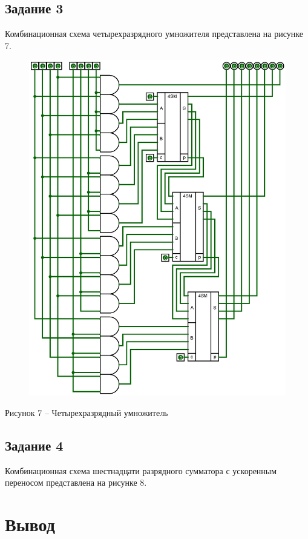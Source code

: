 \documentclass[a4paper,14pt]{extarticle}
\begin{document}
	\subsection*{Задание 3}
	Комбинационная схема четырехразрядного умножителя представлена на рисунке 7.
	\begin{figure}[h]
		\centering
		\includegraphics[width=0.9\linewidth]{images/s-3}
	\end{figure}
	\begin{center}
		Рисунок 7 – Четырехразрядный умножитель
	\end{center}
	
	\pagebreak
	\subsection*{Задание 4}
	Комбинационная схема шестнадцати разрядного сумматора с ускоренным переносом представлена на рисунке 8.
	
	\section*{Вывод}
	
\end{document}
